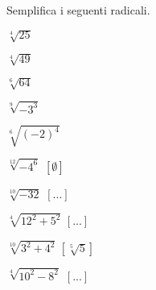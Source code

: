 \begin{esercizio}[*]
\label{ese:2.24}
Semplifica i seguenti radicali.
\vspace{-.5em}
\begin{htmulticols}{3}
\begin{enumeratea}
\item \(\sqrt[4]{25}\) 
\item \(\sqrt[4]{49}\) 
\item \(\sqrt[6]{64}\) 
%  
\item \(\sqrt[9]{-3^3}\) 
\item \(\sqrt[6]{(-2)^4}\) 
\item \(\sqrt[12]{-4^6}\)
\hfill \(\left[\emptyset\right]\)
\item \(\sqrt[10]{-32}\)
\hfill \(\left[...\right]\)
\item \(\sqrt[4]{12^2+5^2}\)
\hfill \(\left[...\right]\)
\item \(\sqrt[10]{3^2+4^2}\)
\hfill \(\left[\sqrt[5]5\right]\)
\item \(\sqrt[4]{10^2-8^2}\)
\hfill \(\left[...\right]\)

\end{enumeratea}
\end{htmulticols}
\end{esercizio}
